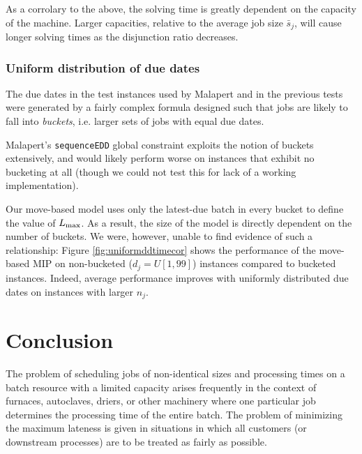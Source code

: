 \documentclass[13pt, letterpaper, oneside]{book}
\begin{document}
As a corrolary to the above, the solving time is greatly dependent on the
capacity of the machine. Larger capacities, relative to the average job size
$\bar{s}_j$, will cause longer solving times as the disjunction ratio decreases.

\subsection{Uniform distribution of due dates}
The due dates in the test instances used by Malapert and in the previous tests
were generated by a fairly complex formula designed such that jobs are likely to
fall into \textit{buckets}, i.e. larger sets of jobs with equal due dates.

Malapert's \texttt{sequenceEDD} global constraint exploits the notion of buckets
extensively, and would likely perform worse on instances that exhibit no
bucketing at all (though we could not test this for lack of a working
implementation).

Our move-based model uses only the latest-due batch in every bucket to define
the value of $L_{\text{max}}$. As a result, the size of the model is directly dependent
on the number of buckets. We were, however, unable to find evidence of such a
relationship: Figure \ref{fig:uniformddtimecor} shows the performance of the
move-based MIP on non-bucketed ($d_j = U[1, 99]$) instances compared to bucketed
instances.  Indeed, average performance improves with uniformly distributed due dates on
instances with larger $n_j$.



\chapter{Conclusion}\label{sec:futurework}
The problem of scheduling jobs of non-identical sizes and processing times on a
batch resource with a limited capacity arises frequently in the context of
furnaces, autoclaves, driers, or other machinery where one particular job
determines the processing time of the entire batch. The problem of minimizing
the maximum lateness is given in situations in which all customers (or
downstream processes) are to be treated as fairly as possible.
\end{document}
